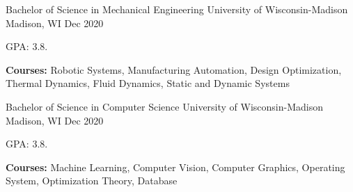 \begin{cventries}
  \cventry
	{Bachelor of Science in Mechanical Engineering} %
	{University of Wisconsin-Madison} %
	{Madison, WI} %
	{Dec 2020} %
	{
	  \begin{cvitems} %
		\item {GPA: 3.8.}
	    \item {\textbf{Courses:} Robotic Systems, Manufacturing Automation, Design Optimization, Thermal Dynamics, Fluid Dynamics, Static and Dynamic Systems}
	  \end{cvitems}
	}

  \cventry
	{Bachelor of Science in Computer Science} %
	{University of Wisconsin-Madison} %
	{Madison, WI} %
	{Dec 2020} %
	{
	  \begin{cvitems} %
		\item {GPA: 3.8.}
		\item {\textbf{Courses:} Machine Learning, Computer Vision, Computer Graphics, Operating System, Optimization Theory, Database}
	  \end{cvitems}
	}
\end{cventries}
